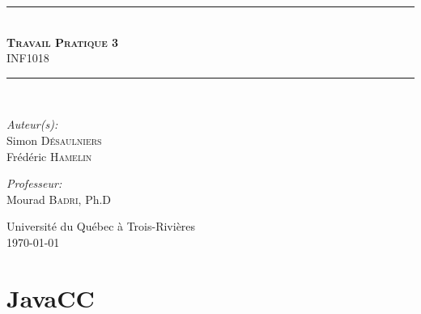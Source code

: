 \documentclass[11pt,french]{article}
\begin{document}
    \begin{titlepage}
        \begin{center}
            \noindent\rule{13cm}{1pt}\\[0.4cm]
            \textsc{\huge \bfseries Travail Pratique 3}\\
                                    INF1018\\[0.4cm]
            \noindent\rule{13cm}{1pt}\\[5cm]

            \begin{minipage}{0.4\textwidth}
                \begin{flushleft}
                \large\emph{Auteur(s):}\\[0.5cm]
                    Simon \textsc{Désaulniers}\\
                    Frédéric \textsc{Hamelin}
                \end{flushleft}
            \end{minipage}
            \begin{minipage}{0.5\textwidth}
                \begin{flushright} \large
                    \emph{Professeur:} \\[0.5cm]
                    Mourad \textsc{Badri}, Ph.D
                    \vspace{\parskip}
                \end{flushright}
            \end{minipage}

            \vfill
            {\large Université du Québec à Trois-Rivières\\ \today}
        \end{center}
        \thispagestyle{empty}
    \end{titlepage}

    \setcounter{page}{1}


    \section{JavaCC} %
    \label{sec:javacc}
\end{document}
